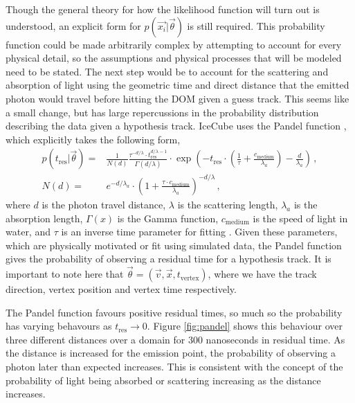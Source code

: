 Though the general theory for how the likelihood function will turn out is understood, an explicit form for $p\left(\vec{x_{i}}\bigr\rvert\vec{\theta}\right)$ is still required. This probability function could be made arbitrarily complex by attempting to account for every physical detail, so the assumptions and physical processes that will be modeled need to be stated. The next step would be to account for the scattering and absorption of light using the geometric time and direct distance that the emitted photon would travel before hitting the DOM given a guess track. This seems like a small change, but has large repercussions in the probability distribution describing the data given a hypothesis track. IceCube uses the Pandel function \cite{phd_kai}, which explicitly takes the following form,
\begin{equation}\label{eq:pandel}
  \begin{split}
    p\left(t_{\text{res}}\bigr\rvert\vec{\theta}\right) = & \frac{1}{N(d)}\frac{\tau^{-d/\lambda}\cdot t_{\text{res}}^{d/\lambda - 1}}{\Gamma(d/\lambda)}\cdot \exp\left(-t_{\text{res}}\cdot\left(\frac{1}{\tau} + \frac{c_{\text{medium}}}{\lambda_{a}}\right) - \frac{d}{\lambda_{a}}\right)\, , \\
    N(d) = & e^{-d/\lambda_{a}}\cdot\left(1 + \frac{\tau \cdot c_{\text{medium}}}{\lambda_{a}}\right)^{-d/\lambda}\, ,
  \end{split}
\end{equation}
where $d$ is the photon travel distance, $\lambda$ is the scattering length, $\lambda_{a}$ is the absorption length, $\Gamma(x)$ is the Gamma function, $c_{\text{medium}}$ is the speed of light in water, and $\tau$ is an inverse time parameter for fitting \cite{phd_kai}. Given these parameters, which are physically motivated or fit using simulated data, the Pandel function gives the probability of observing a residual time for a hypothesis track. It is important to note here that $\vec{\theta} = (\vec{v}, \vec{x}, t_{\text{vertex}})$, where we have the track direction, vertex position and vertex time respectively.

The Pandel function favours positive residual times, so much so the probability has varying behavours as $t_{\text{res}}\to 0$. Figure \ref{fig:pandel} shows this behaviour over three different distances over a domain for 300 nanoseconds in residual time. As the distance is increased for the emission point, the probability of observing a photon later than expected increases. This is consistent with the concept of the probability of light being absorbed or scattering increasing as the distance increases. 

